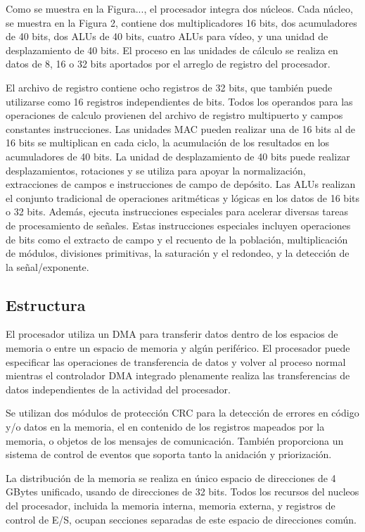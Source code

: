Como se muestra en la Figura..., el procesador integra dos núcleos. Cada núcleo, se muestra en la Figura 2, contiene dos
multiplicadores 16 bits, dos acumuladores de 40 bits, dos ALUs  de 40 bits, cuatro ALUs para vídeo, y una unidad de
desplazamiento de 40 bits. El proceso en las unidades de cálculo se realiza en datos de 8, 16 o 32 bits aportados por el
arreglo de registro del procesador.

El archivo de registro contiene ocho registros de 32 bits, que también puede utilizarse como 16 registros independientes
de bits. Todos los operandos para las operaciones de calculo provienen del archivo de registro multipuerto y campos
constantes instrucciones. Las unidades MAC pueden realizar una de 16 bits al de 16 bits se multiplican en cada ciclo, la
acumulación de los resultados en los acumuladores de 40 bits. La unidad de desplazamiento de 40 bits puede realizar
desplazamientos, rotaciones y se utiliza para apoyar la normalización, extracciones de campos e instrucciones de campo de
depósito. Las ALUs realizan el conjunto tradicional de operaciones aritméticas y lógicas en los datos de 16 bits o 32
bits. Además, ejecuta instrucciones especiales para acelerar diversas tareas de procesamiento de señales. Estas
instrucciones especiales incluyen operaciones de bits como el extracto de campo y el recuento de la población,
multiplicación de módulos, divisiones primitivas, la saturación y el redondeo, y la 
detección de la señal/exponente.

\subsection{Estructura}

El procesador utiliza un DMA para transferir datos dentro de los espacios de memoria o entre un espacio de memoria y
algún periférico. El procesador puede especificar las operaciones de transferencia de datos y volver al proceso normal
mientras el controlador DMA integrado plenamente realiza las transferencias de datos independientes de la actividad del
procesador. 

Se utilizan dos módulos de protección CRC \cite{Waqar2010} para la detección de errores en código y/o datos en la
memoria, el en contenido de los registros mapeados por la memoria, o objetos de los mensajes de comunicación. También
proporciona un sistema de control de eventos que soporta tanto la anidación y priorización. 


La distribución de la memoria se realiza en único espacio de direcciones de 4 GBytes  unificado, usando de direcciones de
32 bits. Todos los recursos del nucleos del procesador, incluida la memoria interna, memoria externa, y registros de
control de E/S, ocupan secciones separadas de este espacio de direcciones común. 

